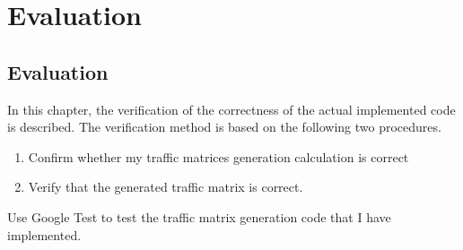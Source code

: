 \chapter{Evaluation}
\label{evaluation}

\section{Evaluation}
In this chapter, the verification of the correctness of the actual implemented code is described. 
The verification method is based on the following two procedures.

\begin{enumerate}
    \item Confirm whether my traffic matrices generation calculation is correct
    \item Verify that the generated traffic matrix is correct.
\end{enumerate}

Use Google Test to test the traffic matrix generation code that I have implemented.

